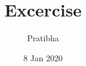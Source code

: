 \documentclass{beamer}
\title[Your Short Title]{Excercise}
\author{Pratibha}
\institute{}
\date{8 Jan 2020}
\begin{document}
\begin{frame}
  \titlepage
\end{frame}








\end{document}
